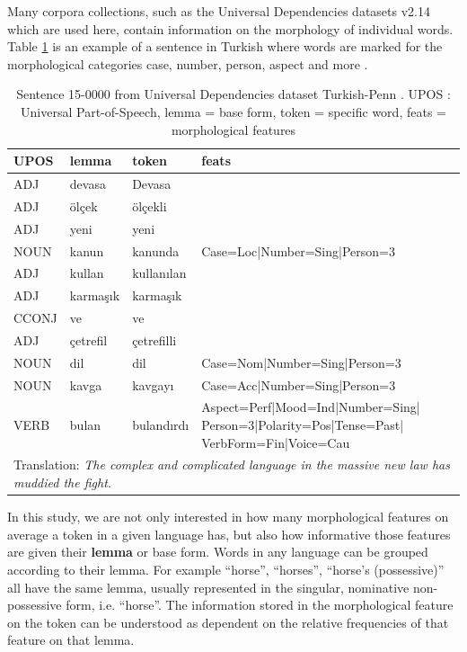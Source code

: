 \documentclass[USenglish]{article}
\begin{document}
Many corpora collections, such as the Universal Dependencies datasets v2.14 \citep{UD_2.14} which are used here, contain information on the morphology of individual words. 
Table \ref{tab:turkish_example} is an example of a sentence in Turkish where words are marked for the morphological categories case, number, person, aspect and more \citep{kuzgun_2020_UD_turkish_penn}.

\begin{table}[h]
    \centering
    \caption{Sentence 15-0000 from Universal Dependencies dataset Turkish-Penn \citep{kuzgun_2020_UD_turkish_penn}. UPOS : Universal Part-of-Speech, lemma = base form, token = specific word, feats = morphological features} %
    \label{tab:turkish_example}   
    \begin{tabular}{p{1.5cm}p{2cm}p{2cm}p{5cm}}
\toprule
	\textbf{UPOS}	&	\textbf{lemma}	&	\textbf{token}	&	\textbf{feats}	\\
    \midrule
	ADJ	&	devasa	&	Devasa	&	\\    \midrule
	ADJ	&	ölçek	&	ölçekli	&\\    \midrule
ADJ	&	yeni	&	yeni	&		\\    \midrule
	NOUN	&	kanun	&	kanunda	&	Case=Loc|Number=Sing|Person=3	\\    \midrule
	ADJ	&	kullan	&	kullanılan	&		\\    \midrule
ADJ	&	karmaşık	&	karmaşık	&\\    \midrule
CCONJ	&	ve	&	ve	&		\\    \midrule
ADJ	&	çetrefil	&	çetrefilli	&		\\    \midrule
	NOUN	&	dil	&	dil	&	Case=Nom|Number=Sing|Person=3	\\    \midrule
	NOUN	&	kavga	&	kavgayı	&	Case=Acc|Number=Sing|Person=3	\\    \midrule
	VERB	&	bulan	&	bulandırdı	&	Aspect=Perf|Mood=Ind|Number=Sing| Person=3|Polarity=Pos|Tense=Past| VerbForm=Fin|Voice=Cau	\\\midrule
   \multicolumn{4}{p{11cm}}{Translation: \textit{The complex and complicated language in the massive new law has muddied the fight.}}\\    \bottomrule
    \end{tabular}
\end{table}

In this study, we are not only interested in how many morphological features on average a token in a given language has, but also how informative those features are given their \textbf{lemma} or base form. 
Words in any language can be grouped according to their lemma. 
For example ``horse'', ``horses'', ``horse's (possessive)'' all have the same lemma, usually represented in the singular, nominative non-possessive form, i.e. ``horse''.
The information stored in the morphological feature on the token can be understood as dependent on the relative frequencies of that feature on that lemma. 
\end{document}
